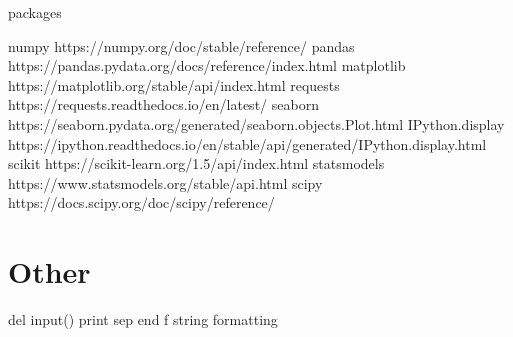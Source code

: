 \documentclass[10pt]{article}
\begin{document}
  packages

    numpy https://numpy.org/doc/stable/reference/
    pandas https://pandas.pydata.org/docs/reference/index.html
    matplotlib https://matplotlib.org/stable/api/index.html
    requests https://requests.readthedocs.io/en/latest/
    seaborn https://seaborn.pydata.org/generated/seaborn.objects.Plot.html
    IPython.display https://ipython.readthedocs.io/en/stable/api/generated/IPython.display.html
    scikit https://scikit-learn.org/1.5/api/index.html
    statsmodels https://www.statsmodels.org/stable/api.html
    scipy https://docs.scipy.org/doc/scipy/reference/

\section{Other}

  del
  input()
  print 
    sep
    end
  f string formatting
  
\end{document}
